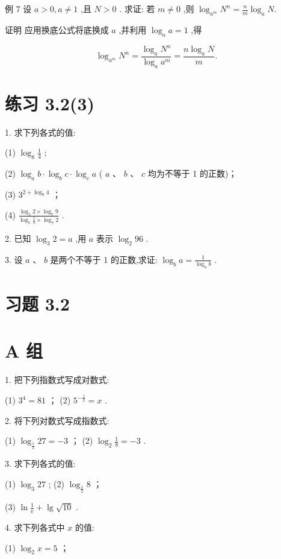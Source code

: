 \documentclass[10pt]{article}
\begin{document}
例 7 设 \(a > 0,a \neq  1\) ,且 \(N > 0\) . 求证: 若 \(m \neq  0\) ,则 \({\log }_{{a}^{m}}{N}^{n} = \frac{n}{m}{\log }_{a}N.\)

证明 应用换底公式将底换成 \(a\) ,并利用 \({\log }_{a}a = 1\) ,得

\[
{\log }_{{a}^{m}}{N}^{n} = \frac{{\log }_{a}{N}^{n}}{{\log }_{a}{a}^{m}} = \frac{n{\log }_{a}N}{m}.
\]

\section*{练习 3.2(3)}

1. 求下列各式的值:

(1) \({\log }_{8}\frac{1}{4}\) ;

(2) \({\log }_{a}b \cdot  {\log }_{b}c \cdot  {\log }_{c}a\) ( \(a\) 、 \(b\) 、 \(c\) 均为不等于 1 的正数)；

(3) \({3}^{2 + {\log }_{9}4}\) ；

(4) \(\frac{{\log }_{5}2 \times  {\log }_{7}9}{{\log }_{5}\frac{1}{3} \times  {\log }_{7}2}\) .

2. 已知 \({\log }_{3}2 = a\) ,用 \(a\) 表示 \({\log }_{2}{96}\) .

3. 设 \(a\text{ 、 }b\) 是两个不等于 1 的正数,求证: \({\log }_{b}a = \frac{1}{{\log }_{a}b}\) .



\section*{习题 3.2}

\section*{A 组}

1. 把下列指数式写成对数式:

(1) \({3}^{4} = {81}\) ； (2) \({5}^{-\frac{1}{2}} = x\) .

2. 将下列对数式写成指数式:

(1) \({\log }_{\frac{1}{3}}{27} =  - 3\) ； (2) \({\log }_{2}\frac{1}{8} =  - 3\) .

3. 求下列各式的值:

(1) \({\log }_{3}{27}\) ; (2) \({\log }_{\frac{1}{2}}8\) ；

(3) \(\ln \frac{1}{\mathrm{e}} + \lg \sqrt{10}\) .

4. 求下列各式中 \(x\) 的值:

(1) \({\log }_{2}x = 5\) ；
\end{document}
